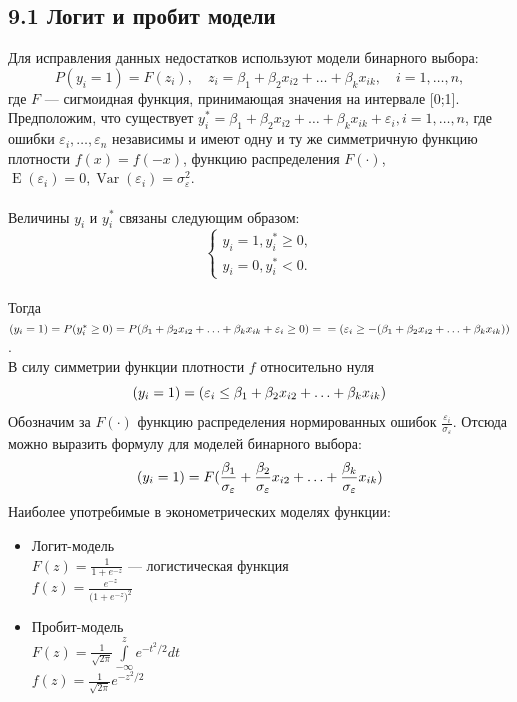 \documentclass[a0,final]{a0poster}
\DeclareMathOperator{\Var}{Var}
\DeclareMathOperator{\E}{E}
\let\P\relax
\DeclareMathOperator{\P}{P}
\begin{document}
\begin{multicols}{4}
\subsection*{9.1 Логит и пробит модели}
Для исправления данных недостатков используют модели бинарного выбора: \[P(y_i = 1) = F(z_i), \quad z_i = \beta_1 + \beta_2x_{i2} + \ldots + \beta_kx_{ik}, \quad i = 1, \ldots, n,\] где $F$ — сигмоидная функция, принимающая значения на интервале [0;1]. \\
Предположим, что существует $y_i^* = \beta_1 + \beta_2x_{i2} + \ldots + \beta_kx_{ik} + \varepsilon_i, i = 1, \ldots, n$, где ошибки $\varepsilon_i, \ldots, \varepsilon_n$ независимы и имеют одну и ту же симметричную функцию плотности $f(x) = f(-x)$, функцию распределения $F(\cdot)$, $\E(\varepsilon_i) = 0, \Var(\varepsilon_i) = \sigma^2_\varepsilon$.\\
\\
Величины $y_i$ и $y_i^*$ связаны следующим образом:
\begin{equation*}
 \begin{cases}
   y_i = 1, y^*_i \geq 0,\\
   y_i = 0, y^*_i < 0.
 \end{cases}
\end{equation*}
\\
Тогда $\P(y_i = 1) = P(y^*_i \geq 0) = P(\beta_1 + \beta_2x_{i2} + \ldots + \beta_kx_{ik} + \varepsilon_i \geq 0) =\\
= \P(\varepsilon_i \geq -(\beta_1 + \beta_2x_{i2} + \ldots + \beta_kx_{ik}))$.\\
В силу симметрии функции плотности $f$ относительно нуля \[\P(y_i = 1) = \P(\varepsilon_i \leq \beta_1 + \beta_2x_{i2} + \ldots + \beta_kx_{ik})\]
Обозначим за $F(\cdot)$ функцию распределения нормированных ошибок $\frac{\varepsilon_i}{\sigma_\varepsilon}$. Отсюда можно выразить формулу для моделей бинарного выбора:
\[\P(y_i = 1) = F(\frac{\beta_1}{\sigma_\varepsilon} + \frac{\beta_2}{\sigma_\varepsilon}x_{i2} + \ldots + \frac{\beta_k}{\sigma_\varepsilon}x_{ik})\]
Наиболее употребимые в эконометрических моделях функции:
\begin{itemize}
\item Логит-модель\\
$F(z) = \frac{1}{1 + e^{-z}}$ — логистическая функция\\
$f(z) = \frac{ e^{-z}}{{(1 + e^{-z}})^2}$
\item Пробит-модель\\
$F(z) = \frac{1}{\sqrt{2\pi}} \overset{z}{\underset{-\infty}{\int}} {e^{-{t^2}/2}dt}$\\
$f(z) = \frac{1}{\sqrt{2\pi}} e^{-{z^2}/2}$
\end{itemize}

\end{multicols}
\end{document}
